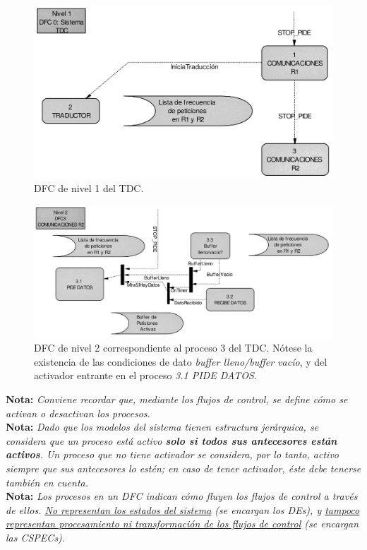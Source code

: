 \begin{figure}[H]
    \centering
    \includegraphics[width=0.8\linewidth]{Resources/Tema5/nivel1_DFC.png}
    \caption{DFC de nivel 1 del TDC.}
\end{figure}

\begin{figure}[H]
    \centering
    \includegraphics[width=0.9\linewidth]{Resources/Tema5/nivel2_Proceso3_DFC.png}
    \caption{DFC de nivel 2 correspondiente al proceso $3$ del TDC. Nótese la existencia de las condiciones de dato \textit{buffer lleno/buffer vacío}, y del activador entrante en el proceso \textit{3.1 PIDE DATOS}.}
\end{figure}

\textbf{Nota:} \textit{Conviene recordar que, mediante los flujos de control, se define cómo se activan o desactivan los procesos.}\\

\textbf{Nota:} \textit{Dado que los modelos del sistema tienen estructura jerárquica, se considera que un proceso está activo \textbf{solo si todos sus antecesores están activos}. Un proceso que no tiene activador se considera, por lo tanto, activo siempre que sus antecesores lo estén; en caso de tener activador, éste debe tenerse también en cuenta.}\\

\textbf{Nota:} \textit{Los procesos en un DFC indican cómo fluyen los flujos de control a través de ellos. \uline{No representan los estados del sistema} (se encargan los DEs), y \uline{tampoco representan procesamiento ni transformación de los flujos de control} (se encargan las CSPECs).}\\

